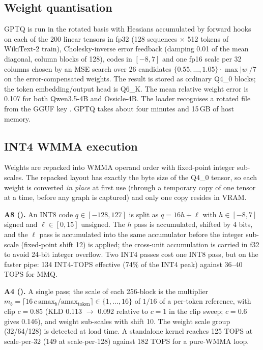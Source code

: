 \documentclass[10.5pt,a4paper]{article}
\newcommand{\tx}[1]{\texttt{\detokenize{#1}}}
\begin{document}
\subsection{Weight quantisation}
GPTQ is run in the rotated basis with Hessians accumulated by forward hooks on each of the 200 linear tensors in fp32 (128 sequences $\times$ 512 tokens of WikiText-2 train), Cholesky-inverse
error feedback (damping 0.01 of the mean diagonal, column blocks of 128), codes in $[-8,7]$ and one fp16 scale per 32 columns chosen by an MSE search over 26 candidates
$\{0.55,\ldots,1.05\}\cdot\max|w|/7$ on the error-compensated weights. The result is stored as ordinary Q4\_0 blocks; the token embedding/output head is Q6\_K. The mean relative weight error is
0.107 for both Qwen3.5-4B and Ossicle-4B. The loader recognises a rotated file from the GGUF key \tx{ossicle.int4_rotation_block}. GPTQ takes about four minutes and 15\,GB of host memory.

\subsection{INT4 WMMA execution}
Weights are repacked into WMMA operand order with fixed-point integer sub-scales. The repacked layout has exactly the byte size of the Q4\_0 tensor, so each weight is converted \emph{in place}
at first use (through a temporary copy of one tensor at a time, before any graph is captured) and only one copy resides in VRAM.

\textbf{A8 (\tx{quality}).} An INT8 code $q\in[-128,127]$ is split as $q=16h+\ell$ with $h\in[-8,7]$ signed and $\ell\in[0,15]$ unsigned. The $h$ pass is accumulated, shifted by 4 bits, and the
$\ell$ pass is accumulated into the same accumulator before the integer sub-scale (fixed-point shift 12) is applied; the cross-unit accumulation is carried in f32 to avoid 24-bit integer overflow.
Two INT4 passes cost one INT8 pass, but on the faster pipe: 134 INT4-TOPS effective (74\% of the INT4 peak) against 36--40 TOPS for MMQ.

\textbf{A4 (\tx{fast}).} A single pass; the scale of each 256-block is the multiplier $m_b=\lceil16\,c\,\mathrm{amax}_b/\mathrm{amax}_{\text{token}}\rceil\in\{1,\ldots,16\}$ of $1/16$ of a per-token
reference, with clip $c=0.85$ (KLD 0.113 $\to$ 0.092 relative to $c=1$ in the clip sweep; $c=0.6$ gives 0.146), and weight sub-scales with shift 10. The weight scale group (32/64/128) is detected at load time.
A standalone kernel reaches 125 TOPS at scale-per-32 (149 at scale-per-128) against 182 TOPS for a pure-WMMA loop.
\end{document}
